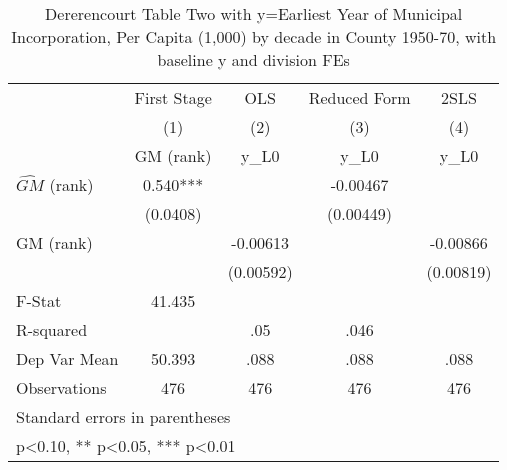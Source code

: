 \begin{table}[htbp]\centering
\def\sym#1{\ifmmode^{#1}\else\(^{#1}\)\fi}
\caption{Dererencourt Table Two with y=Earliest Year of Municipal Incorporation, Per Capita (1,000) by decade in County 1950-70, with baseline y and division FEs}
\begin{tabular}{l*{4}{c}}
\toprule
                    & First Stage   &         OLS   &Reduced Form   &        2SLS   \\
                    &\multicolumn{1}{c}{(1)}&\multicolumn{1}{c}{(2)}&\multicolumn{1}{c}{(3)}&\multicolumn{1}{c}{(4)}\\
                    &\multicolumn{1}{c}{GM  (rank)}&\multicolumn{1}{c}{y\_L0}&\multicolumn{1}{c}{y\_L0}&\multicolumn{1}{c}{y\_L0}\\
\midrule
$\hat{GM}$ (rank)   &       0.540***&               &    -0.00467   &               \\
                    &    (0.0408)   &               &   (0.00449)   &               \\
\addlinespace
GM  (rank)          &               &    -0.00613   &               &    -0.00866   \\
                    &               &   (0.00592)   &               &   (0.00819)   \\
\midrule
F-Stat              &      41.435   &               &               &               \\
R-squared           &               &         .05   &        .046   &               \\
Dep Var Mean        &      50.393   &        .088   &        .088   &        .088   \\
Observations        &         476   &         476   &         476   &         476   \\
\bottomrule
\multicolumn{5}{l}{\footnotesize Standard errors in parentheses}\\
\multicolumn{5}{l}{\footnotesize * p<0.10, ** p<0.05, *** p<0.01}\\
\end{tabular}
\end{table}
